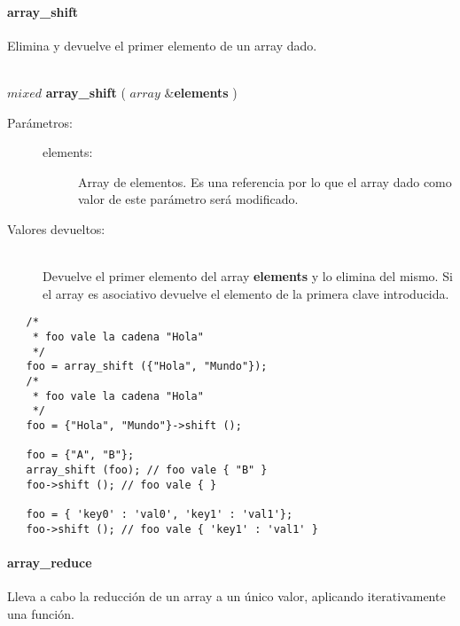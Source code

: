 \paragraph{array\_shift}
Elimina y devuelve el primer elemento de un array dado. 

\begin{framed}
\hfill \\ $mixed$ \textbf{array\_shift} ( $array$ \&\textbf{elements} )  
\begin{description}
\item [Parámetros:] \hfill 
   \begin{description}
   \item[elements:] Array de elementos. Es una referencia por lo que el array dado como valor de este parámetro será modificado. 
   \end{description}
\item[Valores devueltos:] \hfill \\
   Devuelve el primer elemento del array \textbf{elements} y lo elimina del mismo. Si el array es asociativo devuelve el
   elemento de la primera clave introducida.
\end{description}
\end{framed}
     
\begin{lstlisting}   
   /*
    * foo vale la cadena "Hola"
    */
   foo = array_shift ({"Hola", "Mundo"}); 
   /*
    * foo vale la cadena "Hola"
    */
   foo = {"Hola", "Mundo"}->shift ();
   
   foo = {"A", "B"};
   array_shift (foo); // foo vale { "B" }
   foo->shift (); // foo vale { }
   
   foo = { 'key0' : 'val0', 'key1' : 'val1'};
   foo->shift (); // foo vale { 'key1' : 'val1' }
\end{lstlisting}

\paragraph{array\_reduce}
Lleva a cabo la reducción de un array a un único valor, aplicando iterativamente una función. 

